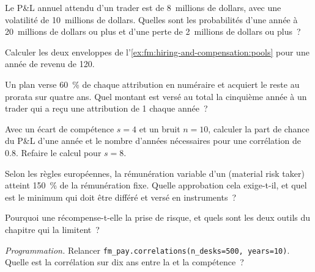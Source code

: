 \begin{exercise}[$\star$]\label{exo:fm:hiring-and-compensation:1}
Le P\&L annuel attendu d'un trader est de 8~millions de dollars, avec une volatilité de 10~millions de dollars. Quelles sont les probabilités d'une année à 20~millions de dollars ou plus et
d'une perte de 2~millions de dollars ou plus~?
\end{exercise}

\begin{exercise}[$\star$]\label{exo:fm:hiring-and-compensation:2}
Calculer les deux enveloppes de l'\cref{ex:fm:hiring-and-compensation:pools} pour une année de revenu de 120.
\end{exercise}

\begin{exercise}[$\star$]\label{exo:fm:hiring-and-compensation:3}
Un plan verse 60~\% de chaque attribution en numéraire et acquiert le reste au prorata sur quatre ans. Quel montant est versé au total la cinquième année à un trader qui a
reçu une attribution de 1 chaque année~?
\end{exercise}

\begin{exercise}[$\star\star$]\label{exo:fm:hiring-and-compensation:4}
Avec un écart de compétence $s=4$ et un bruit $n=10$, calculer la part de chance du P\&L d'une année et le nombre d'années nécessaires pour une corrélation de 0.8. Refaire le calcul pour
$s=8$.
\end{exercise}

\begin{exercise}[$\star\star$]\label{exo:fm:hiring-and-compensation:5}
Selon les règles européennes, la rémunération variable d'un  (material risk taker) atteint 150~\% de la rémunération fixe. Quelle approbation cela exige-t-il, et quel est le minimum qui doit être
différé et versé en instruments~?
\end{exercise}

\begin{exercise}[$\star\star$]\label{exo:fm:hiring-and-compensation:6}
Pourquoi une  récompense-t-elle la prise de risque, et quels sont les deux outils du chapitre qui la limitent~?
\end{exercise}

\begin{exercise}[$\star\star\star$]\label{exo:fm:hiring-and-compensation:7}
\emph{Programmation.} Relancer \texttt{fm\_pay.correlations(n\_desks=500, years=10)}. Quelle est la corrélation sur dix ans entre la  et la compétence~?
\end{exercise}

